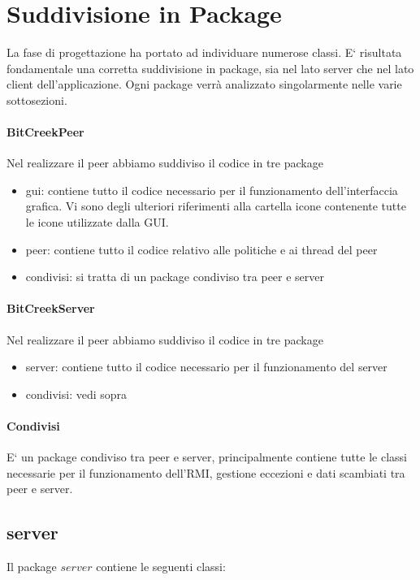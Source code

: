 \section{Suddivisione in Package}

La fase di progettazione ha portato ad individuare numerose classi. E` risultata fondamentale una corretta suddivisione in package, sia nel lato server che nel lato client dell'applicazione. Ogni package verr\`a analizzato singolarmente nelle varie sottosezioni.

\paragraph{BitCreekPeer}
Nel realizzare il peer abbiamo suddiviso il codice in tre package
\begin{itemize}
\item gui: contiene tutto il codice necessario per il funzionamento dell'interfaccia grafica. Vi sono degli ulteriori riferimenti alla cartella icone contenente tutte le icone utilizzate dalla GUI.
\item peer: contiene tutto il codice relativo alle politiche e ai thread del peer
\item condivisi: si tratta di un package condiviso tra peer e server
\end{itemize}
\paragraph{BitCreekServer}
Nel realizzare il peer abbiamo suddiviso il codice in tre package
\begin{itemize}
\item server: contiene tutto il codice necessario per il funzionamento del server
\item condivisi: vedi sopra
\end{itemize}
\paragraph{Condivisi}
E` un package condiviso tra peer e server, principalmente contiene tutte le classi necessarie per il funzionamento dell'RMI, gestione eccezioni e dati scambiati tra peer e server.

\subsection{server}

Il package $server$ contiene le seguenti classi:

